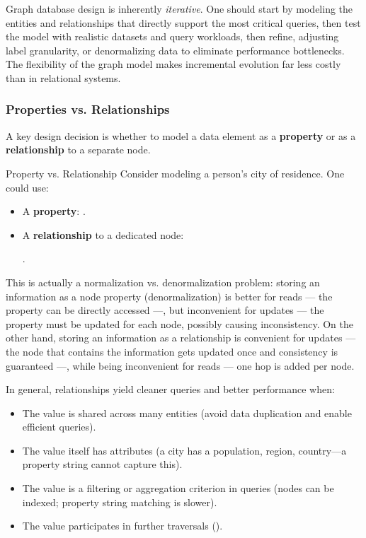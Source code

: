 \noindent
Graph database design is inherently \emph{iterative}. 
One should start by modeling the entities and relationships that directly support the most critical queries, then test the model with realistic datasets and query workloads, then refine, adjusting label granularity, or denormalizing data to eliminate performance bottlenecks. 
The flexibility of the graph model makes incremental evolution far less costly than in relational systems.

\subsubsection{Properties vs. Relationships}

A key design decision is whether to model a data element as a \textbf{property} or as a \textbf{relationship} to a separate node.

\begin{example}{Property vs. Relationship}
    Consider modeling a person's city of residence. One could use:
    \begin{itemize}
        \item A \textbf{property}: .
        \item A \textbf{relationship} to a dedicated node: 
        \begin{center}
            .
        \end{center}
    \end{itemize}
\end{example}
This is actually a normalization vs. denormalization problem: storing an information as a node property (denormalization) is better for reads --- the property can be directly accessed ---, but inconvenient for updates --- the property must be updated for each node, possibly causing inconsistency.
On the other hand, storing an information as a relationship is convenient for updates --- the node that contains the information gets updated once and consistency is guaranteed ---, while being inconvenient for reads --- one hop is added per node.

In general, relationships yield cleaner queries and better performance when:

\begin{itemize}
    \item The value is shared across many entities (avoid data duplication and enable efficient  queries).
    \item The value itself has attributes (a city has a population, region, country---a property string cannot capture this).
    \item The value is a filtering or aggregation criterion in queries (nodes can be indexed; property string matching is slower).
    \item The value participates in further traversals ().
\end{itemize}

